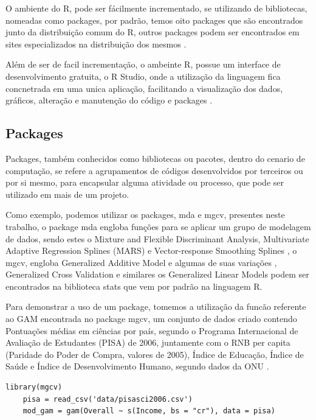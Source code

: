 \documentclass[
	12pt,				%
	openright,			%
	oneside,			%
	a4paper,			%
	english,			%
	brazil				%
	]{abntex2}
\begin{document}
O ambiente do R, pode ser fácilmente incrementado, se utilizando de bibliotecas, nomeadas como packages, por padrão,
temos oito packages que são encontrados junto da distribuição comum do R, outros packages podem ser encontrados em sites
especializados na distribuição dos mesmos \cite{ling_r}.

Além de ser de facil incrementação, o ambeinte R, possue um interface de desenvolvimento gratuita, o R Studio, onde
a utilização da linguagem fica concnetrada em uma unica aplicação, facilitando a visualização dos dados, gráficos, alteração
e manutenção do código e packages \cite{rstudio}.

\subsection{Packages}

Packages, também conhecidos como bibliotecas ou pacotes, dentro do cenario de computação, se refere a agrupamentos de códigos
desenvolvidos por terceiros ou por si mesmo, para encapsular alguma atividade ou processo, que pode ser utilizado em mais
de um projeto.

Como exemplo, podemos utilizar os packages, mda e mgcv, presentes neste trabalho, o package mda engloba funções para se aplicar
um grupo de modelagem de dados, sendo estes o Mixture and Flexible Discriminant Analysis, Multivariate Adaptive Regression 
Splines (MARS) e Vector-response Smoothing Splines \cite{mda}, o mgcv, engloba Generalized Additive Model e algumas de suas variações
, Generalized Cross Validation e similares \cite{mgcv} os Generalized Linear Models podem ser encontrados na biblioteca stats que
vem por padrão na linguagem R.

Para demonstrar a uso de um package, tomemos a utilização da funcão referente ao GAM encontrada no package mgcv, um conjunto de dados
criado contendo Pontuações médias em ciências por país, segundo o Programa Internacional de Avaliação de Estudantes (PISA) de 2006,
juntamente com o RNB per capita (Paridade do Poder de Compra, valores de 2005), Índice de Educação, Índice de Saúde e 
Índice de Desenvolvimento Humano, segundo dados da ONU \cite{gam_exemplo}.

\lstset{style=r_code}
\begin{lstlisting}[caption={\label{Exemplo uso de package}Exemplo uso de package}]
	library(mgcv)
	pisa = read_csv('data/pisasci2006.csv')
	mod_gam = gam(Overall ~ s(Income, bs = "cr"), data = pisa)
\end{lstlisting}
\end{document}

